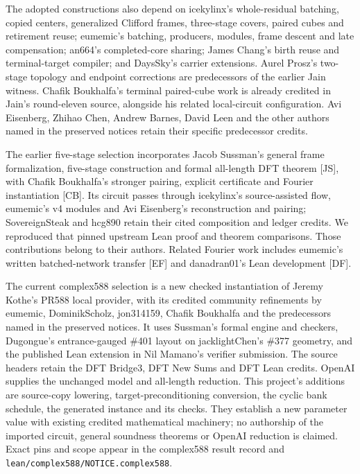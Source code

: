 \documentclass[
  11pt,
]{article}
\begin{document}
The adopted constructions also depend on icekylinx's whole-residual
batching, copied centers, generalized Clifford frames, three-stage
covers, paired cubes and retirement reuse; eumemic's batching,
producers, modules, frame descent and late compensation; an664's
completed-core sharing; James Chang's birth reuse and terminal-target
compiler; and DaysSky's carrier extensions. Aurel Prosz's two-stage
topology and endpoint corrections are predecessors of the earlier Jain
witness. Chafik Boukhalfa's terminal paired-cube work is already
credited in Jain's round-eleven source, alongside his related
local-circuit configuration. Avi Eisenberg, Zhihao Chen, Andrew Barnes,
David Leen and the other authors named in the preserved notices retain
their specific predecessor credits.

The earlier five-stage selection incorporates Jacob Sussman's general
frame formalization, five-stage construction and formal all-length DFT
theorem {[}JS{]}, with Chafik Boukhalfa's stronger pairing, explicit
certificate and Fourier instantiation {[}CB{]}. Its circuit passes
through icekylinx's source-assisted flow, eumemic's v4 modules and Avi
Eisenberg's reconstruction and pairing; SovereignSteak and hcg890 retain
their cited composition and ledger credits. We reproduced that pinned
upstream Lean proof and theorem comparisons. Those contributions belong
to their authors. Related Fourier work includes eumemic's written
batched-network transfer {[}EF{]} and danadran01's Lean development
{[}DF{]}.

The current complex588 selection is a new checked instantiation of
Jeremy Kothe's PR588 local provider, with its credited community
refinements by eumemic, DominikScholz, jon314159, Chafik Boukhalfa and
the predecessors named in the preserved notices. It uses Sussman's
formal engine and checkers, Dugongue's entrance-gauged \#401 layout on
jacklightChen's \#377 geometry, and the published Lean extension in Nil
Mamano's verifier submission. The source headers retain the DFT Bridge3,
DFT New Sums and DFT Lean credits. OpenAI supplies the unchanged model
and all-length reduction. This project's additions are source-copy
lowering, target-preconditioning conversion, the cyclic bank schedule,
the generated instance and its checks. They establish a new parameter
value with existing credited mathematical machinery; no authorship of
the imported circuit, general soundness theorems or OpenAI reduction is
claimed. Exact pins and scope appear in the complex588 result record and
\texttt{lean/\allowbreak{}complex588/\allowbreak{}NOTICE.complex588}.
\end{document}

